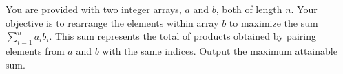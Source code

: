 You are provided with two integer arrays, $a$ and $b$, both of length $n$.
Your objective is to rearrange the elements within array $b$ to maximize the sum $\sum_{i=1}^{n} a_ib_i$.
This sum represents the total of products obtained by pairing elements from $a$ and $b$ with the same indices.
Output the maximum attainable sum.